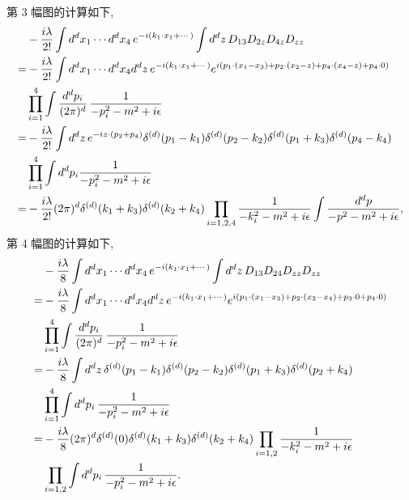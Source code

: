 \begin{itemize}
	\begin{tcolorbox}[title=calculation:]
		第 3 幅图的计算如下,
		\begin{align}
			& - \frac{i \lambda}{2!} \int d^d x_1 \cdots d^d x_4 \, e^{- i (k_1 \cdot x_1 + \cdots)} \int d^d z \, D_{1 3} D_{2 z} D_{4 z} D_{z z} \notag \\
			=& - \frac{i \lambda}{2!} \int d^d x_1 \cdots d^d x_4 d^d z \, e^{- i (k_1 \cdot x_1 + \cdots)} e^{i (p_1 \cdot (x_1 - x_3) + p_2 \cdot (x_2 - z) + p_4 \cdot (x_4 - z) + p_4 \cdot 0)} \notag \\
			& \prod_{i = 1}^4 \int \frac{d^d p_i}{(2 \pi)^d} \, \frac{1}{- p_i^2 - m^2 + i \epsilon} \notag \\
			=& - \frac{i \lambda}{2!} \int d^d z \, e^{- i z \cdot (p_2 + p_4)} \delta^{(d)}(p_1 - k_1) \delta^{(d)}(p_2 - k_2) \delta^{(d)}(p_1 + k_3) \delta^{(d)}(p_4 - k_4) \notag \\
			& \prod_{i = 1}^4 \int d^d p_i \frac{1}{- p_i^2 - m^2 + i \epsilon} \notag \\
			=& - \frac{i \lambda}{2!} (2 \pi)^d \delta^{(d)}(k_1 + k_3) \delta^{(d)}(k_2 + k_4) \prod_{i = 1, 2, 4} \frac{1}{- k_i^2 - m^2 + i \epsilon} \int \frac{d^d p}{- p^2 - m^2 + i \epsilon},
		\end{align}
		第 4 幅图的计算如下,
		\begin{align}
			& - \frac{i \lambda}{8} \int d^d x_1 \cdots d^d x_4 \, e^{- i (k_1 \cdot x_1 + \cdots)} \int d^d z \, D_{1 3} D_{2 4} D_{z z} D_{z z} \notag \\
			=& - \frac{i \lambda}{8} \int d^d x_1 \cdots d^d x_4 d^d z \, e^{- i (k_1 \cdot x_1 + \cdots)} e^{i (p_1 \cdot (x_1 - x_3) + p_2 \cdot (x_2 - x_4) + p_3 \cdot 0 + p_4 \cdot 0)} \notag \\
			& \prod_{i = 1}^4 \int \frac{d^d p_i}{(2 \pi)^d} \, \frac{1}{- p_i^2 - m^2 + i \epsilon} \notag \\
			=& - \frac{i \lambda}{8} \int d^d z \, \delta^{(d)}(p_1 - k_1) \delta^{(d)}(p_2 - k_2) \delta^{(d)}(p_1 + k_3) \delta^{(d)}(p_2 + k_4) \notag \\
			& \prod_{i = 1}^4 \int d^d p_i \, \frac{1}{- p_i^2 - m^2 + i \epsilon} \notag \\
			=& - \frac{i \lambda}{8} (2 \pi)^d \delta^{(d)}(0) \delta^{(d)}(k_1 + k_3) \delta^{(d)}(k_2 + k_4) \prod_{i = 1, 2} \frac{1}{- k_i^2 - m^2 + i \epsilon} \notag \\
			& \prod_{i = 1, 2} \int d^d p_i \, \frac{1}{- p_i^2 - m^2 + i \epsilon}.
		\end{align}
	\end{tcolorbox}
	

\end{itemize}
